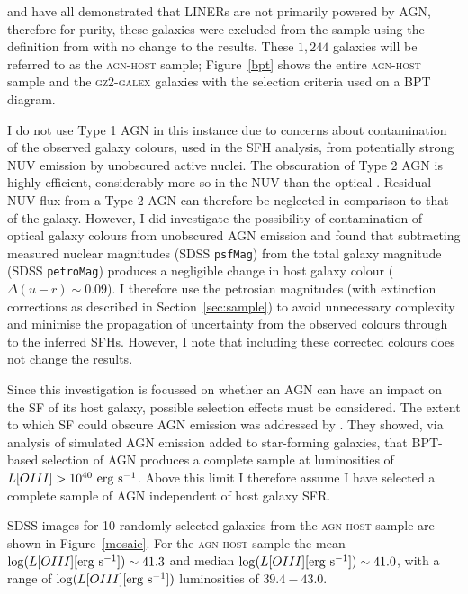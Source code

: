 \cite{Sarzi10, yan12} and \cite{Singh13} have all demonstrated that LINERs are not primarily powered by AGN, therefore for purity, these galaxies were excluded from the sample using the definition from \cite[][$55$ galaxies total]{kewley06} with no change to the results. These $1,244$ galaxies will be referred to as the \textsc{agn-host} sample; Figure~\ref{bpt} shows the entire \textsc{agn-host} sample and the \textsc{gz2-galex} galaxies with the selection criteria used on a BPT diagram.

I do not use Type 1 AGN in this instance due to concerns about contamination of the observed galaxy colours, used in the SFH analysis, from potentially strong NUV emission by unobscured active nuclei. The obscuration of Type 2 AGN is highly efficient, considerably more so in the NUV than the optical \citep{Simmons11}. Residual NUV flux from a Type 2 AGN can therefore be neglected in comparison to that of the galaxy. However, I did investigate the possibility of contamination of optical galaxy colours from unobscured AGN emission and found that subtracting measured nuclear magnitudes (SDSS {\tt psfMag}) from the total galaxy magnitude (SDSS {\tt petroMag}) produces a negligible change in host galaxy colour ($\Delta(u-r) \sim 0.09$). I therefore use the petrosian magnitudes (with extinction corrections as described in Section~\ref{sec:sample}) to avoid unnecessary complexity and minimise the propagation of uncertainty from the observed colours through to the inferred SFHs. However, I note that including these corrected colours does not change the results.

Since this investigation is focussed on whether an AGN can have an impact on the SF of its host galaxy, possible selection effects must be considered. The extent to which SF could obscure AGN emission was addressed by \cite{schawinski10a}. They showed, via analysis of simulated AGN emission added to star-forming galaxies, that BPT-based selection of AGN produces a complete sample at luminosities of $L[OIII] > 10^{40}~\rm{erg~s}^{-1}$. Above this limit I therefore assume I have selected a complete sample of AGN independent of host galaxy SFR.


SDSS images for 10 randomly selected galaxies from the \textsc{agn-host} sample are shown in Figure~\ref{mosaic}.  For the \textsc{agn-host} sample the mean $\log (L[OIII] [\rm{erg~s^{-1}}]) \sim 41.3$ and median $\log (L[OIII] [\rm{erg~s^{-1}}]) \sim 41.0$, with a range of $\log (L[OIII] [\rm{erg~s^{-1}}])$ luminosities of $39.4-43.0$. 

